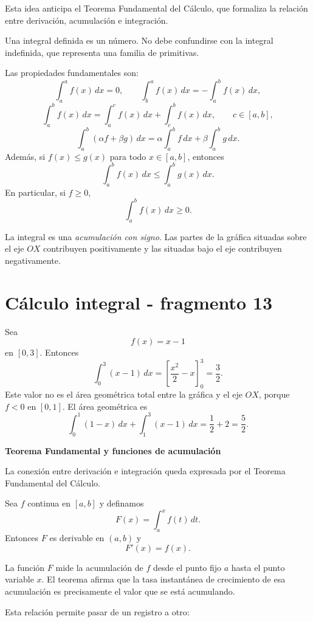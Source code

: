 Esta idea anticipa el Teorema Fundamental del Cálculo, que formaliza la relación entre derivación, acumulación e integración.

Una integral definida es un número. No debe confundirse con la integral indefinida, que representa una familia de primitivas.

Las propiedades fundamentales son:
\[
\int_a^a f(x)\,dx=0,
\qquad
\int_b^a f(x)\,dx=-\int_a^b f(x)\,dx,
\]
\[
\int_a^b f(x)\,dx
=
\int_a^c f(x)\,dx+\int_c^b f(x)\,dx,
\qquad c\in[a,b],
\]
\[
\int_a^b(\alpha f+\beta g)\,dx
=
\alpha\int_a^b f\,dx+\beta\int_a^b g\,dx.
\]
Además, si $f(x)\leq g(x)$ para todo $x\in[a,b]$, entonces
\[
\int_a^b f(x)\,dx\leq\int_a^b g(x)\,dx.
\]
En particular, si $f\geq0$,
\[
\int_a^b f(x)\,dx\geq0.
\]

La integral es una \emph{acumulación con signo}. Las partes de la gráfica situadas sobre el eje $OX$ contribuyen positivamente y las situadas bajo el eje contribuyen negativamente.


\section{Cálculo integral - fragmento 13}
\begin{example}
Sea
\[
f(x)=x-1
\]
en $[0,3]$. Entonces
\[
\int_0^3(x-1)\,dx
=
\left[\frac{x^2}{2}-x\right]_0^3
=\frac32.
\]
Este valor no es el área geométrica total entre la gráfica y el eje $OX$, porque $f<0$ en $[0,1]$. El área geométrica es
\[
\int_0^1(1-x)\,dx+\int_1^3(x-1)\,dx
=\frac12+2=\frac52.
\]
\end{example}

\textbf{Teorema Fundamental y funciones de acumulación}

La conexión entre derivación e integración queda expresada por el Teorema Fundamental del Cálculo.

\begin{theorem}
Sea $f$ continua en $[a,b]$ y definamos
\[
F(x)=\int_a^x f(t)\,dt.
\]
Entonces $F$ es derivable en $(a,b)$ y
\[
\boxed{F'(x)=f(x).}
\]
\end{theorem}

La función $F$ mide la acumulación de $f$ desde el punto fijo $a$ hasta el punto variable $x$. El teorema afirma que la tasa instantánea de crecimiento de esa acumulación es precisamente el valor que se está acumulando.

Esta relación permite pasar de un registro a otro:

